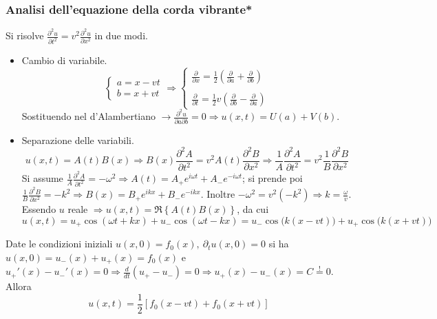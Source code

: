 \documentclass[10pt, a4paper]{scrartcl}
\numberwithin{equation}{subsection}
\theoremstyle{style1}
\begin{document}
\subsubsection{Analisi dell'equazione della corda vibrante*}
Si risolve $\frac{\partial ^2u }{\partial t^2} = v^2 \frac{\partial ^2 u }{\partial x^2} $ in due modi.
\begin{itemize}
	\item Cambio di variabile.
		\[
		\begin{cases}
			a=x-vt \\
			b = x+vt
		\end{cases}\Rightarrow \begin{cases}
			\displaystyle \frac{\partial }{\partial x} = \frac{1}{2} \left(\frac{\partial }{\partial a} + \frac{\partial }{\partial b} \right) \\
			\\
			\displaystyle \frac{\partial }{\partial t} = \frac{1}{2}v \left(\frac{\partial }{\partial b} - \frac{\partial }{\partial a} \right) 
		\end{cases}
		\] 
	Sostituendo nel d'Alambertiano $\to \frac{\partial ^2 u }{\partial a \partial b} =0\Rightarrow u (x,t) = U(a) + V(b)$.
\item Separazione delle variabili.
	\[
		u (x,t) = A(t) B(x) \Rightarrow B(x) \frac{\partial ^2 A}{\partial t^2} = v^2 A(t) \frac{\partial ^2 B}{\partial x^2} \Rightarrow \frac{1}{A}\frac{\partial ^2 A}{\partial t^2} = v^2 \frac{1}{B}\frac{\partial ^2B}{\partial x^2} 
	\] 
Si assume $\frac{1}{A} \frac{\partial ^2A}{\partial t^2} =-\omega^2\Rightarrow A(t) = A_+ e^{i\omega t} + A_- e^{-i\omega t}  $; si prende poi $\frac{1}{B}\frac{\partial ^2B}{\partial x^2} =-k^2\Rightarrow B(x) = B_+ e^{ikx}+B_- e^{-ikx}  $. Inoltre $-\omega^2 = v^2 (-k^2) \Rightarrow k = \frac{\omega}{v}$. Essendo $u $ reale $\Rightarrow u (x,t) = \Re\left\{ A(t) B(x) \right\} $, da cui
\begin{equation*}
	u(x,t) = u _+ \cos(\omega t + kx) + u _-\cos(\omega t - kx)=u _- \cos\big(k(x-vt)\big) + u _+ \cos\big(k(x+vt)\big)
\end{equation*}
\end{itemize}
Date le condizioni iniziali $u (x,0) = f_0(x), \ \partial _t u(x,0) = 0$ si ha $u(x,0) = u_- (x) + u_+(x) = f_0(x)$ e $u_+'(x) - u_-' (x) = 0 \Rightarrow \frac{d }{d t} (u_+ - u_-) = 0\Rightarrow u_+(x) - u_-(x) = C\stackrel{!}{=}0$. Allora
\begin{equation}
	u(x,t) = \frac{1}{2}\left[ f_0(x-vt) + f_0 (x+vt)\right] 
\end{equation}
\end{document}
